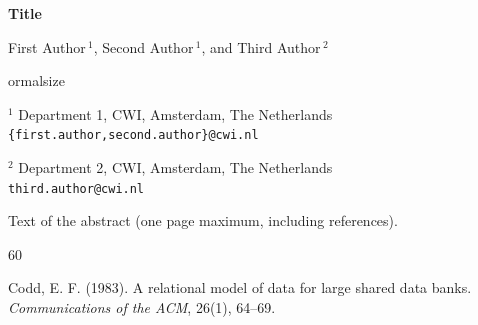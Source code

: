 \documentclass[11pt]{article}
\begin{document}
\begin{center}
    \Large{\textbf{Title}}
    
    \vspace{0.5cm}
    
    
    \large{First Author$\,^1$, Second Author$\,^1$, and Third Author$\,^2$}
    
    \vspace{0.5cm}
    
    
ormalsize
    
    
    $^1$ Department 1, CWI, Amsterdam, The Netherlands\\
    \texttt{\{first.author,second.author\}@cwi.nl}
    
    $^2$ Department 2, CWI, Amsterdam, The Netherlands\\
    \texttt{third.author@cwi.nl}
    
    \vspace{0.6cm}
    
\end{center}

Text of the abstract (one page maximum, including references).

\begin{thebibliography}{60}

 Codd, E. F. (1983). A relational model of data for large shared data banks. \textit{Communications of the ACM}, 26(1), 64--69.

\end{thebibliography}
\end{document}
